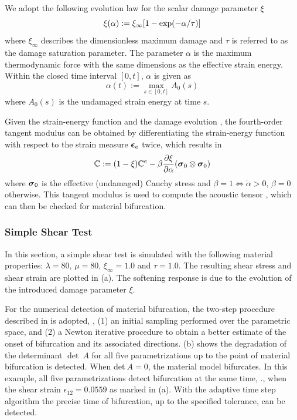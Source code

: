 \documentclass[12pt]{article}
\numberwithin{equation}{section}
\begin{document}
We adopt the following evolution law for the scalar damage parameter $
\xi$ \cite{Holzapfel:2000}
\begin{equation}\label{eq:iso_xi}
  \xi(\alpha) := \xi_{\infty} [ 1- {\rm exp}(-\alpha / \tau)]
\end{equation}
where $\xi_{\infty}$ describes the dimensionless maximum damage and
$\tau$ is referred to as the damage saturation parameter. The
parameter $\alpha$ is the maximum thermodynamic force
\cite{Holzapfel:2000} with the same dimensions as the effective strain
energy. Within the closed time interval $[0,t]$, $\alpha$ is given as
\begin{equation}\label{eq:alpha}
  \alpha(t) := \max_{s\in [0,t]}A_0(s)
\end{equation}
where $A_0(s)$ is the undamaged strain energy at time $s$.

Given the strain-energy function  and the damage
evolution , the fourth-order tangent modulus can be
obtained by differentiating the strain-energy function with respect to
the strain measure ${\boldsymbol{\epsilon}}_e$ twice, which results in
\begin{equation}
  \mathbb{C} := (1-\xi)\mathbb{C}^e
    - \beta \frac{\partial\xi}{\partial\alpha}
    ({\boldsymbol{\sigma}}_0\otimes{\boldsymbol{\sigma}}_0)
\end{equation}
where ${\boldsymbol{\sigma}}_0$ is the effective (undamaged) Cauchy stress and
$\beta = 1 \iff \dot{\alpha} > 0$, $\beta=0$ otherwise. This tangent
modulus is used to compute the acoustic tensor
, which can then be checked for material
bifurcation.

\subsubsection{Simple Shear Test}

In this section, a simple shear test is simulated with the following
material properties: $\lambda = 80$, $\mu = 80$, $\xi_{\infty} = 1.0$
and $\tau = 1.0$. The resulting shear stress and shear strain are
plotted in (a). The softening response is
due to the evolution of the introduced damage parameter $\xi$.

For the numerical detection of material bifurcation, the two-step
procedure described in  is adopted, \ie, (1) an
initial sampling performed over the parametric space, and (2) a Newton
iterative procedure to obtain a better estimate of the onset of
bifurcation and its associated directions.
(b) shows the degradation of the
determinant $\det~A$ for all five parametrizations up to the point of
material bifurcation is detected. When det$~A = 0$, the material model
bifurcates. In this example, all five parametrizations detect
bifurcation at the same time, \ie., when the shear strain
$\epsilon_{12}=0.0559$ as marked in 
(a). With the adaptive time step algorithm the precise time of
bifurcation, up to the specified tolerance, can be detected.
\end{document}
